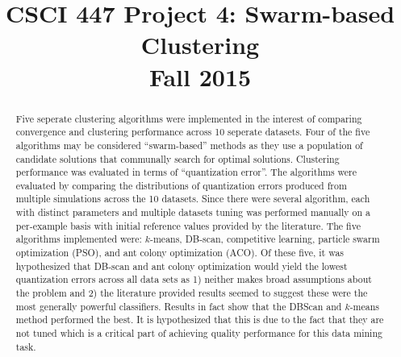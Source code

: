 \documentclass[conference]{IEEEtran}
\begin{document}
\title{CSCI 447 Project 4: Swarm-based Clustering \\ Fall 2015}

\author{
  \and
  }

\maketitle

\begin{abstract}
  Five seperate clustering algorithms were implemented in the interest of comparing convergence and clustering performance across 10 seperate datasets. Four of the five algorithms may be considered ``swarm-based'' methods as they use a population of candidate solutions that communally search for optimal solutions. Clustering performance was evaluated in terms of ``quantization error''. The algorithms were evaluated by comparing the distributions of quantization errors produced from multiple simulations across the 10 datasets. Since there were several algorithm, each with distinct parameters and multiple datasets tuning was performed manually on a per-example basis with initial reference values provided by the literature. The five algorithms implemented were: $k$-means, DB-scan, competitive learning, particle swarm optimization (PSO), and ant colony optimization (ACO). Of these five, it was hypothesized that DB-scan and ant colony optimization would yield the lowest quantization errors across all data sets as 1) neither makes broad assumptions about the problem and 2) the literature provided results seemed to suggest these were the most generally powerful classifiers. Results in fact show that the DBScan and $k$-means method performed the best. It is hypothesized that this is due to the fact that they are not tuned which is a critical part of achieving quality performance for this data mining task.
  
\end{abstract}
\end{document}
